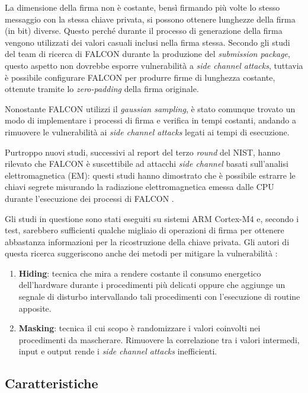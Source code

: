 La dimensione della firma non è costante, bensì firmando più volte lo stesso messaggio con la stessa chiave privata, si possono ottenere lunghezze della firma (in bit) diverse. Questo perché durante il processo di generazione della firma vengono utilizzati dei valori casuali inclusi nella firma stessa. Secondo gli studi del team di ricerca di FALCON durante la produzione del \textit{submission package}, questo aspetto non dovrebbe esporre vulnerabilità a \textit{side channel attacks}, tuttavia è possibile configurare FALCON per produrre firme di lunghezza costante, ottenute tramite lo \textit{zero-padding} della firma originale. 

Nonostante FALCON utilizzi il \textit{gaussian sampling}, è stato comunque trovato un modo di implementare i processi di firma e verifica in tempi costanti, andando a rimuovere le vulnerabilità ai \textit{side channel attacks} legati ai tempi di esecuzione.

Purtroppo nuovi studi, successivi al report del terzo \textit{round} del NIST, hanno rilevato che FALCON è suscettibile ad attacchi \textit{side channel} basati sull'analisi elettromagnetica (EM): questi studi hanno dimostrato che è possibile estrarre le chiavi segrete misurando la radiazione elettromagnetica emessa dalle CPU durante l'esecuzione dei processi di FALCON \cite{falcon-sidechannel-attack}.

Gli studi in questione sono stati eseguiti su sistemi ARM Cortex-M4 e, secondo i test, sarebbero sufficienti qualche migliaio di operazioni di firma per ottenere abbastanza informazioni per la ricostruzione della chiave privata. Gli autori di questa ricerca suggeriscono anche dei metodi per mitigare la vulnerabilità \cite{falcon-sidechannel-attack}:
\begin{enumerate}
    \item \textbf{Hiding}: tecnica che mira a rendere costante il consumo energetico dell'hardware durante i procedimenti più delicati oppure che aggiunge un segnale di disturbo intervallando tali procedimenti con l'esecuzione di routine apposite.
    \item \textbf{Masking}: tecnica il cui scopo è randomizzare i valori coinvolti nei procedimenti da mascherare. Rimuovere la correlazione tra i valori intermedi, input e output rende i \textit{side channel attacks} inefficienti.
\end{enumerate}

\subsection{Caratteristiche}

